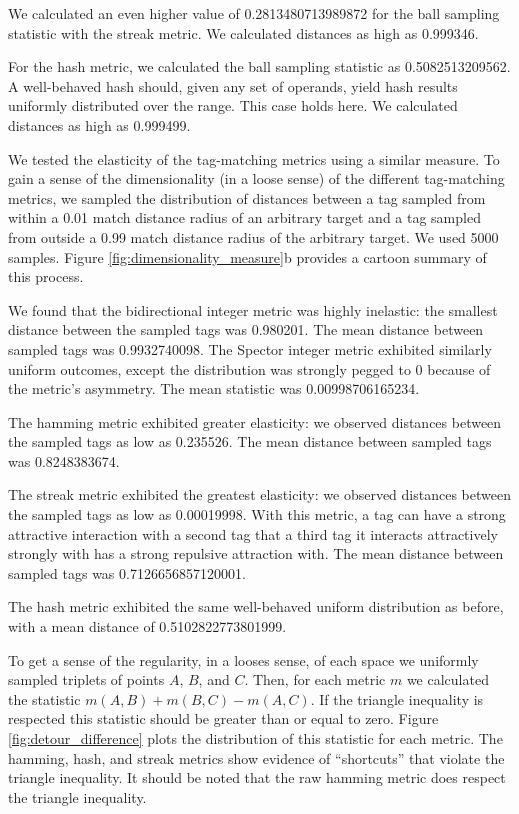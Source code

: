 We calculated an even higher value of 0.2813480713989872 for the ball sampling statistic with the streak metric.
We calculated distances as high as 0.999346.

For the hash metric, we calculated the ball sampling statistic as 0.5082513209562.
A well-behaved hash should, given any set of operands, yield hash results uniformly distributed over the range.
This case holds here.
We calculated distances as high as 0.999499.



We tested the elasticity of the tag-matching metrics using a similar measure.
To gain a sense of the dimensionality (in a loose sense) of the different tag-matching metrics, we sampled the distribution of distances between a tag sampled from within a 0.01 match distance radius of an arbitrary target and a tag sampled from outside a 0.99 match distance radius of the arbitrary target.
We used 5000 samples.
Figure \ref{fig:dimensionality_measure}b provides a cartoon summary of this process.

We found that the bidirectional integer metric was highly inelastic: the smallest distance between the sampled tags was 0.980201.
The mean distance between sampled tags was 0.9932740098.
The Spector integer metric exhibited similarly uniform outcomes, except the distribution was strongly pegged to 0 because of the metric's asymmetry.
The mean statistic was 0.00998706165234.

The hamming metric exhibited greater elasticity: we observed distances between the sampled tags as low as 0.235526.
The mean distance between sampled tags was 0.8248383674.

The streak metric exhibited the greatest elasticity: we observed distances between the sampled tags as low as 0.00019998.
With this metric, a tag can have a strong attractive interaction with a second tag that a third tag it interacts attractively strongly with has a strong repulsive attraction with.
The mean distance between sampled tags was 0.7126656857120001.

The hash metric exhibited the same well-behaved uniform distribution as before, with a mean distance of 0.5102822773801999.



To get a sense of the regularity, in a looses sense, of each space we uniformly sampled triplets of points $A$, $B$, and $C$.
Then, for each metric $m$ we calculated the statistic $m(A, B) + m(B, C) - m(A, C)$.
If the triangle inequality is respected this statistic should be greater than or equal to zero.
Figure \ref{fig:detour_difference} plots the distribution of this statistic for each metric.
The hamming, hash, and streak metrics show evidence of ``shortcuts'' that violate the triangle inequality.
It should be noted that the raw hamming metric does respect the triangle inequality.

